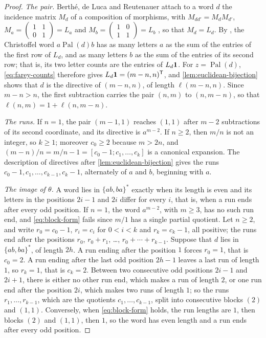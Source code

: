\begin{proof}
\emph{The pair.} Berth\'e, de Luca and Reutenauer attach to a word $d$ the
incidence matrix $M_d$ of a composition of morphisms, with $M_{dd'}=M_dM_{d'}$,
$M_a=\left(\begin{smallmatrix}1&1\\0&1\end{smallmatrix}\right)=L_a$ and
$M_b=\left(\begin{smallmatrix}1&0\\1&1\end{smallmatrix}\right)=L_b$
\cite[proofs of Proposition~3.1 and Corollary~3.2]{BertheDeLucaReutenauer2008},
so that $M_d=L_d$. By \cite[Corollary~3.1]{BertheDeLucaReutenauer2008}, the
Christoffel word $a\operatorname{Pal}(d)b$ has as many letters $a$ as the sum
of the entries of the first row of $L_d$, and as many letters $b$ as the sum
of the entries of its second row; that is, its two letter counts are the
entries of $L_d{\bf1}$. For $z=\operatorname{Pal}(d)$, \eqref{eq:farey-counts}
therefore gives $L_d{\bf1}=(m-n,n)^{\mathsf T}$, and \cref{lem:euclidean-bijection}
shows that $d$ is the directive of $(m-n,n)$, of length $\ell(m-n,n)$. Since
$m-n>n$, the first subtraction carries the pair $(n,m)$ to $(n,m-n)$, so that
$\ell(n,m)=1+\ell(n,m-n)$.

\emph{The runs.} If $n=1$, the pair $(m-1,1)$ reaches $(1,1)$ after $m-2$
subtractions of its second coordinate, and its directive is $a^{m-2}$. If
$n\geqslant2$, then $m/n$ is not an integer, so $k\geqslant1$; moreover $c_0\geqslant2$
because $m>2n$, and $(m-n)/n=m/n-1=[c_0-1;c_1,\ldots,c_k]$ is a canonical
expansion. The description of directives after \cref{lem:euclidean-bijection}
gives the runs $c_0-1,c_1,\ldots,c_{k-1},c_k-1$, alternately of $a$ and $b$,
beginning with $a$.

\emph{The image of $\theta$.} A word lies in $\{ab,ba\}^*$ exactly when its
length is even and its letters in the positions $2i-1$ and $2i$ differ for
every $i$, that is, when a run ends after every odd position. If $n=1$, the
word $a^{m-2}$, with $m\geqslant3$, has no such run end, and \eqref{eq:block-form}
fails since $m/1$ has a single partial quotient. Let $n\geqslant2$, and write
$r_0=c_0-1$, $r_i=c_i$ for $0<i<k$ and $r_k=c_k-1$, all positive; the runs end
after the positions $r_0$, $r_0+r_1$, \dots, $r_0+\cdots+r_{k-1}$. Suppose that
$d$ lies in $\{ab,ba\}^*$, of length $2h$. A run ending after the position $1$
forces $r_0=1$, that is $c_0=2$. A run ending after the last odd position
$2h-1$ leaves a last run of length $1$, so $r_k=1$, that is $c_k=2$. Between
two consecutive odd positions $2i-1$ and $2i+1$, there is either no other run
end, which makes a run of length $2$, or one run end after the position $2i$,
which makes two runs of length $1$; so the runs $r_1,\ldots,r_{k-1}$, which are
the quotients $c_1,\ldots,c_{k-1}$, split into consecutive blocks $(2)$ and
$(1,1)$. Conversely, when \eqref{eq:block-form} holds, the run lengths are
$1$, then blocks $(2)$ and $(1,1)$, then $1$, so the word has even length and
a run ends after every odd position.
\end{proof}

